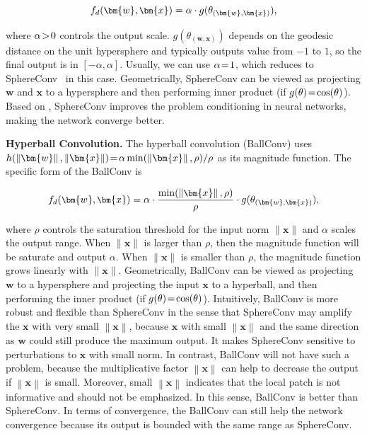 \begin{equation}
        \small
        f_d(\bm{w},\bm{x}) = \alpha\cdot g(\theta_{(\bm{w},\bm{x})}),
        \end{equation}

where $\thickmuskip=2mu \medmuskip=2mu \alpha>0$ controls the output scale. $g(\theta_{(\bm{w},\bm{x})})$ depends on the geodesic distance on the unit hypersphere and typically outputs value from $-1$ to $1$, so the final output is in $[-\alpha,\alpha]$. Usually, we can use $\thickmuskip=2mu \medmuskip=2mu \alpha=1$, which reduces to SphereConv~\cite{liu2017deephyper} in this case. Geometrically, SphereConv can be viewed as projecting $\bm{w}$ and $\bm{x}$ to a hypersphere and then performing inner product (if $\thickmuskip=2mu \medmuskip=2mu g(\theta)=\cos(\theta)$). Based on \cite{liu2017deephyper}, SphereConv improves the problem conditioning in neural networks, making the network converge better.
\par

\textbf{Hyperball Convolution.} The hyperball convolution (BallConv) uses $\thickmuskip=2mu \medmuskip=2mu h(\left\lVert\bm{w}\right\rVert,\left\lVert\bm{x}\right\rVert)=\alpha\min(\left\lVert\bm{x}\right\rVert,\rho)/\rho$ as its magnitude function. The specific form of the BallConv is

\begin{equation}
    \small
        f_d(\bm{w},\bm{x}) = \alpha\cdot\frac{\min(\left\lVert\bm{x}\right\rVert,\rho)}{\rho}\cdot g(\theta_{(\bm{w},\bm{x})}),
    \end{equation}

where $\rho$ controls the saturation threshold for the input norm $\|\bm{x}\|$ and $\alpha$ scales the output range. When $\|\bm{x}\|$ is larger than $\rho$, then the magnitude function will be saturate and output $\alpha$. When $\|\bm{x}\|$ is smaller than $\rho$, the magnitude function grows linearly with $\|\bm{x}\|$. Geometrically, BallConv can be viewed as projecting $\bm{w}$ to a hypersphere and projecting the input $\bm{x}$ to a hyperball, and then performing the inner product (if $\thickmuskip=2mu \medmuskip=2mu g(\theta)=\cos(\theta)$). Intuitively, BallConv is more robust and flexible than SphereConv in the sense that SphereConv may amplify the $\bm{x}$ with very small $\left\lVert\bm{x}\right\rVert$, because $\bm{x}$ with small $\left\lVert\bm{x}\right\rVert$ and the same direction as $\bm{w}$ could still produce the maximum output. It makes SphereConv  sensitive to perturbations to $\bm{x}$ with small norm. In contrast, BallConv will not have such a problem, because the multiplicative factor $\left\lVert\bm{x}\right\rVert$ can help to decrease the output if $\left\lVert\bm{x}\right\rVert$ is small. Moreover, small $\left\lVert\bm{x}\right\rVert$ indicates that the local patch is not informative and should not be emphasized. In this sense, BallConv is better than SphereConv. In terms of convergence, the BallConv can still help the network convergence because its output is bounded with the same range as SphereConv.

